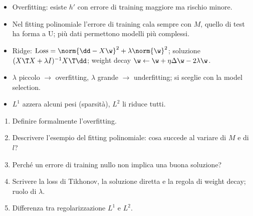 \begin{puntichiave}
\begin{itemize}
  \item Overfitting: esiste $h'$ con errore di training maggiore ma rischio minore.
  \item Nel fitting polinomiale l'errore di training cala sempre con $M$, quello di test ha forma a U; più dati
        permettono modelli più complessi.
  \item Ridge: $\mathrm{Loss} = \norm{\dd-X\w}^2 + \lambda\norm{\w}^2$; soluzione $(X\T X+\lambda I)^{-1}X\T\dd$;
        weight decay $\w\leftarrow\w+\eta\Delta\w-2\lambda\w$.
  \item $\lambda$ piccolo $\to$ overfitting, $\lambda$ grande $\to$ underfitting; si sceglie con la model
        selection.
  \item $L^1$ azzera alcuni pesi (sparsità), $L^2$ li riduce tutti.
\end{itemize}
\end{puntichiave}

\begin{domande}
\begin{enumerate}
  \item Definire formalmente l'overfitting.
  \item Descrivere l'esempio del fitting polinomiale: cosa succede al variare di $M$ e di $l$?
  \item Perché un errore di training nullo non implica una buona soluzione?
  \item Scrivere la loss di Tikhonov, la soluzione diretta e la regola di weight decay; ruolo di $\lambda$.
  \item Differenza tra regolarizzazione $L^1$ e $L^2$.
\end{enumerate}
\end{domande}
